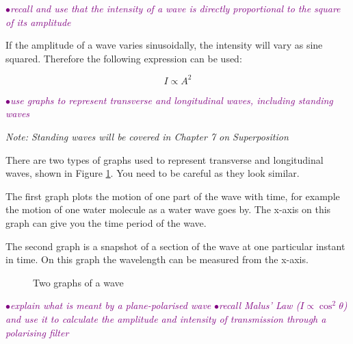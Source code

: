 \documentclass[a4paper,11pt,twoside]{memoir}
\newcounter{spec}[chapter]
\newcommand{\spec}[1]{\Needspace{5\baselineskip}\textcolor{purple}{$\bullet$\hspace{0.5cm}\textit{#1}}}
\begin{document}
\spec{recall and use that the intensity of a wave is directly proportional to the square of its amplitude}

If the amplitude of a wave varies sinusoidally, the intensity will vary as sine squared. Therefore the following expression can be used:

$$I \propto A^2$$

\spec{use graphs to represent transverse and longitudinal waves, including standing waves}

\emph{Note: Standing waves will be covered in Chapter 7 on Superposition}

There are two types of graphs used to represent transverse and longitudinal waves, shown in Figure \ref{twographs}. You need to be careful as they look similar.

The first graph plots the motion of one part of the wave with time, for example the motion of one water molecule as a water wave goes by. The x-axis on this graph can give you the time period of the wave.

The second graph is a snapshot of a section of the wave at one particular instant in time. On this graph the wavelength can be measured from the x-axis.

\begin{figure}[h]
    \begin{center}
    \end{center}
    \caption{Two graphs of a wave}
    \label{twographs}
\end{figure}



\spec{explain what is meant by a plane-polarised wave}
\spec{recall Malus' Law ($I \propto \cos^2\theta $) and use it to calculate the amplitude and intensity of transmission through a polarising filter}
\end{document}
